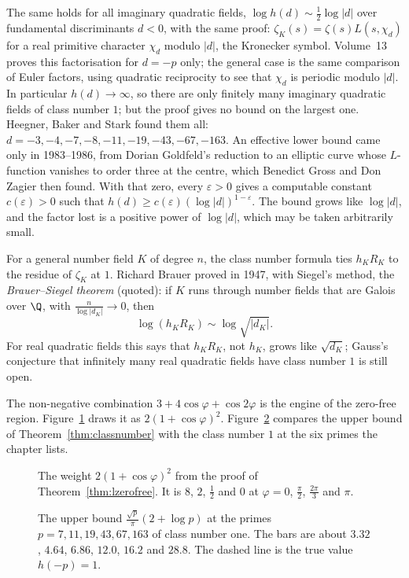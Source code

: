 The same holds for all imaginary quadratic fields, $\log h(d)\sim\frac12\log|d|$ over fundamental discriminants $d<0$, with the same proof: $\zeta_K(s)=\zeta(s)L(s,\chi_d)$ for a real primitive character $\chi_d$ modulo $|d|$, the Kronecker symbol. Volume~13 proves this factorisation for $d=-p$ only; the general case is the same comparison
of Euler factors, using quadratic reciprocity to see that $\chi_d$ is periodic modulo $|d|$. In particular $h(d)\to\infty$, so there are only finitely many imaginary quadratic fields of class number $1$; but the proof gives no bound on the largest one. Heegner, Baker and Stark found them all: $d=-3,-4,-7,-8,-11,-19,-43,-67,-163$. An effective lower
bound came only in 1983--1986, from Dorian Goldfeld's reduction to an elliptic curve whose $L$-function vanishes to order three at the centre, which Benedict Gross and Don Zagier then found. With that zero, every $\varepsilon>0$ gives a computable constant $c(\varepsilon)>0$ such that $h(d)\ge c(\varepsilon)(\log|d|)^{1-\varepsilon}$. The bound grows like $\log|d|$, and the factor lost is a positive power of $\log|d|$, which may be taken arbitrarily small.

For a general number field $K$ of degree $n$, the class number formula ties $h_KR_K$ to the residue of $\zeta_K$ at $1$. Richard Brauer proved in 1947, with Siegel's method, the \emph{Brauer--Siegel theorem} (quoted): if $K$ runs through number fields that are Galois over $\Q$, with $\frac n{\log|d_K|}\to0$, then
\[
\log(h_KR_K)\sim\log\sqrt{|d_K|}.
\]
For real quadratic fields this says that $h_KR_K$, not $h_K$, grows like $\sqrt{d_K}$; Gauss's conjecture that infinitely many real quadratic fields have class number $1$ is still open.

The non-negative combination $3+4\cos\varphi+\cos 2\varphi$ is the engine of the zero-free region. Figure~\ref{fig:v14-extra-02-a} draws it as $2(1+\cos\varphi)^2$. Figure~\ref{fig:v14-extra-02-b} compares the upper bound of Theorem~\ref{thm:classnumber} with the class number $1$ at the six primes the chapter lists.

\begin{figure}[ht]
\centering
{}
\caption{The weight $2(1+\cos\varphi)^2$ from the proof of Theorem~\ref{thm:lzerofree}. It is $8$, $2$, $\frac12$ and $0$ at $\varphi=0$, $\frac\pi2$, $\frac{2\pi}3$ and $\pi$.}
\label{fig:v14-extra-02-a}
\end{figure}

\begin{figure}[ht]
\centering
{}
\caption{The upper bound $\frac{\sqrt p}\pi(2+\log p)$ at the primes $p=7,11,19,43,67,163$ of class number one. The bars are about $3.32$, $4.64$, $6.86$, $12.0$, $16.2$ and $28.8$. The dashed line is the true value $h(-p)=1$.}
\label{fig:v14-extra-02-b}
\end{figure}

